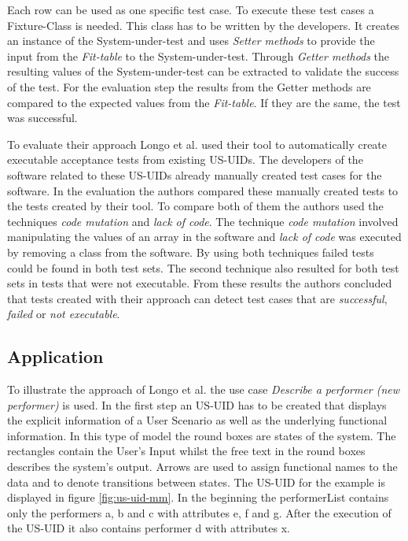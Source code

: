 Each row can be used as one specific test case.
To execute these test cases a Fixture-Class is needed.
This class has to be written by the developers.
It creates an instance of the System-under-test and uses \textit{Setter methods} to provide the input from the \textit{Fit-table} to the System-under-test.
Through \textit{Getter methods} the resulting values of the System-under-test can be extracted to validate the success of the test.
For the evaluation step the results from the Getter methods are compared to the expected values from the \textit{Fit-table}.
If they are the same, the test was successful.

To evaluate their approach Longo et al. used their tool to automatically create executable acceptance tests from existing US-UIDs.
The developers of the software related to these US-UIDs already manually created test cases for the software.
In the evaluation the authors compared these manually created tests to the tests created by their tool.
To compare both of them the authors used the techniques \textit{code mutation} and \textit{lack of code}.
The technique \textit{code mutation} involved manipulating the values of an array in the software and \textit{lack of code} was executed by removing a class from the software.
By using both techniques failed tests could be found in both test sets.
The second technique also resulted for both test sets in tests that were not executable.
From these results the authors concluded that tests created with their approach can detect test cases that are \textit{successful}, \textit{failed} or \textit{not executable}.

\subsection{Application}

To illustrate the approach of Longo et al. the use case \textit{Describe a performer (new performer)} is used.
In the first step an US-UID has to be created that displays the explicit information of a User Scenario as well as the underlying functional information.
In this type of model the round boxes are states of the system.
The rectangles contain the User's Input whilst the free text in the round boxes describes the system's output.
Arrows are used to assign functional names to the data and to denote transitions between states.
The US-UID for the example is displayed in figure \ref{fig:us-uid-mm}.
In the beginning the performerList contains only the performers a, b and c with attributes e, f and g.
After the execution of the US-UID it also contains performer d with attributes x.


